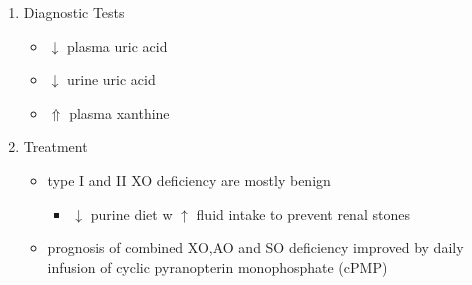 \documentclass{scrartcl}
\begin{document}
\begin{enumerate}
\item Diagnostic Tests
\label{sec:org9128422}
\begin{itemize}
\item \(\downarrow\) plasma uric acid
\item \(\downarrow\) urine uric acid
\item \(\Uparrow\) plasma xanthine
\end{itemize}

\item Treatment
\label{sec:orgf153780}
\begin{itemize}
\item type I and II XO deficiency are mostly benign
\begin{itemize}
\item \(\downarrow\) purine diet w \(\uparrow\) fluid intake to prevent renal stones
\end{itemize}
\item prognosis of combined XO,AO and SO deficiency improved by daily
infusion of cyclic pyranopterin monophosphate (cPMP)
\end{itemize}
\end{enumerate}
\end{document}
